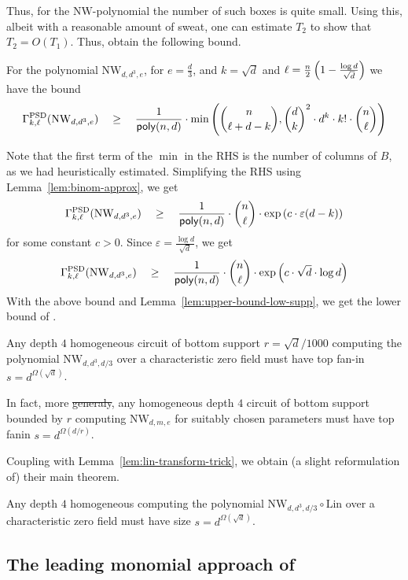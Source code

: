 \documentclass{beatcs}
\newcommand{\NW}{\mathrm{NW}}
\newcommand{\poly}{\mathsf{poly}}
\newcommand{\spaced}[1]{\quad#1\quad}
\renewcommand{\epsilon}{\varepsilon}
\providecommand{\DIFaddtex}[1]{{\protect\color{blue}\uwave{#1}}} %
\providecommand{\DIFdeltex}[1]{{\protect\color{red}\sout{#1}}}                      %
\providecommand{\DIFaddbegin}{} %
\providecommand{\DIFaddend}{} %
\providecommand{\DIFdelbegin}{} %
\providecommand{\DIFdelend}{} %
\providecommand{\DIFadd}[1]{\texorpdfstring{\DIFaddtex{#1}}{#1}} %
\providecommand{\DIFdel}[1]{\texorpdfstring{\DIFdeltex{#1}}{}} %
\begin{document}
Thus, for the $\NW$-polynomial the number of such boxes is quite small. Using this, albeit with a reasonable amount of sweat, one can estimate $T_2$ to show that $T_2 = O(T_1)$. Thus, \cite{KLSS} obtain the following bound. 

\begin{lemma}
For the polynomial $\NW_{d,d^3,e}$, for $e = \frac{d}{3}$, and $k = \sqrt{d}$ and $\ell = \frac{n}{2}\left(1 - \frac{\log d}{\sqrt{d}}\right)$ we have the bound
\[
\Gamma^{\mathrm{PSD}}_{k,\ell}(\NW_{d,d^3,e}) \spaced{\geq} \frac{1}{\poly(n,d)} \cdot \min\inparen{\binom{n}{\ell + d - k}, \binom{d}{k}^2 \cdot d^k \cdot k! \cdot \binom{n}{\ell}}
\]
\end{lemma}
Note that the first term of the $\min$ in the RHS is the number of columns of $B$, as we had heuristically estimated. Simplifying the RHS using Lemma~\ref{lem:binom-approx}, we get
\[
\Gamma^{\mathrm{PSD}}_{k,\ell}(\NW_{d,d^3,e}) \spaced{\geq} \frac{1}{\poly(n,d)} \cdot \binom{n}{\ell}\cdot \exp\inparen{c\cdot \epsilon (d - k)}
\]
for some constant $c > 0$. Since $\epsilon = \frac{\log d}{\sqrt{d}}$, we get 
\[
\Gamma^{\mathrm{PSD}}_{k,\ell}(\NW_{d,d^3,e}) \spaced{\geq} \frac{1}{\poly(n,d)} \cdot \binom{n}{\ell}\cdot \exp\inparen{c\cdot \sqrt{d}\cdot \log d}
\]
With the above bound and Lemma~\ref{lem:upper-bound-low-supp}, we get the lower bound of \cite{KLSS}. 
\begin{theorem}\label{thm:KLSS-lowsupp}
Any depth $4$ homogeneous circuit of bottom support $r = \sqrt{d}/1000$ computing the polynomial $\NW_{d,d^3,d/3}$ over a characteristic zero field must have top fan-in $s = d^{\Omega(\sqrt{d})}$. 

In fact, more \DIFdelbegin \DIFdel{generaly}\DIFdelend \DIFaddbegin \DIFadd{generally}\DIFaddend , any homogeneous depth $4$ circuit of bottom support bounded by $r$ computing $\NW_{d,m,e}$ for suitably chosen parameters must have top fanin $s = d^{\Omega(d/r)}$. 
\end{theorem}

Coupling with Lemma~\ref{lem:lin-transform-trick}, we obtain (a slight reformulation of) their main theorem. 

\begin{theorem}\label{thm:KLSS-main}
Any depth $4$ homogeneous computing the polynomial $\NW_{d,d^3,d/3}\circ \mathrm{Lin}$ over a characteristic zero field must have size $s = d^{\Omega(\sqrt{d})}$. 
\end{theorem}

\subsection{The leading monomial approach of \cite{KS14}}
\end{document}
